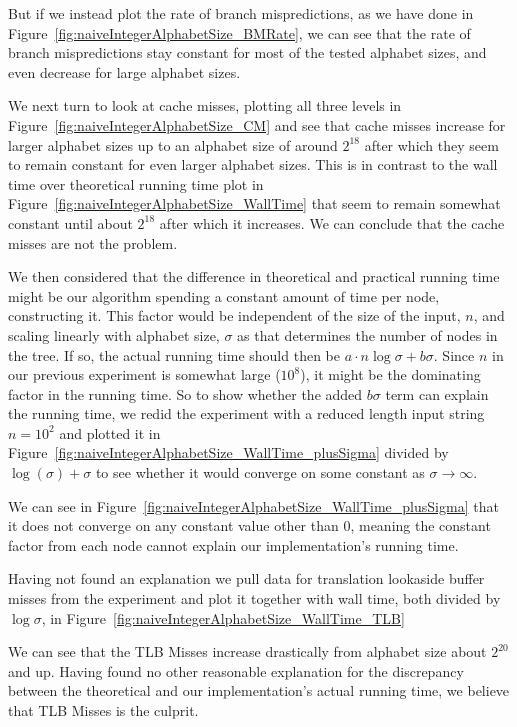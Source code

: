But if we instead plot the rate of branch mispredictions, as we have done in Figure~\ref{fig:naiveIntegerAlphabetSize_BMRate}, we can see that the rate of branch mispredictions stay constant for most of the tested alphabet sizes, and even decrease for large alphabet sizes.

We next turn to look at cache misses, plotting all three levels in Figure~\ref{fig:naiveIntegerAlphabetSize_CM} and see that cache misses increase for larger alphabet sizes up to an alphabet size of around $2^{18}$ after which they seem to remain constant for even larger alphabet sizes.
This is in contrast to the wall time over theoretical running time plot in Figure~\ref{fig:naiveIntegerAlphabetSize_WallTime} that seem to remain somewhat constant until about $2^{18}$ after which it increases.
We can conclude that the cache misses are not the problem.

We then considered that the difference in theoretical and practical running time might be our algorithm spending a constant amount of time per node, constructing it. This factor would be independent of the size of the input, $n$, and scaling linearly with alphabet size, $\sigma$ as that determines the number of nodes in the tree.
If so, the actual running time should then be $a \cdot n \log\sigma + b \sigma$.
Since $n$ in our previous experiment is somewhat large ($10^8$), it might be the dominating factor in the running time.
So to show whether the added $b \sigma$ term can explain the running time, we redid the experiment with a reduced length input string $n = 10^2$ and plotted it in Figure~\ref{fig:naiveIntegerAlphabetSize_WallTime_plusSigma} divided by $\log(\sigma) + \sigma$ to see whether it would converge on some constant as $\sigma \rightarrow \infty$.

We can see in Figure~\ref{fig:naiveIntegerAlphabetSize_WallTime_plusSigma} that it does not converge on any constant value other than 0, meaning the constant factor from each node cannot explain our implementation's running time.

Having not found an explanation we pull data for translation lookaside buffer misses from the experiment and plot it together with wall time, both divided by $\log \sigma$, in Figure~\ref{fig:naiveIntegerAlphabetSize_WallTime_TLB}

We can see that the TLB Misses increase drastically from alphabet size about $2^{20}$ and up.
Having found no other reasonable explanation for the discrepancy between the theoretical and our implementation's actual running time, we believe that TLB Misses is the culprit.

